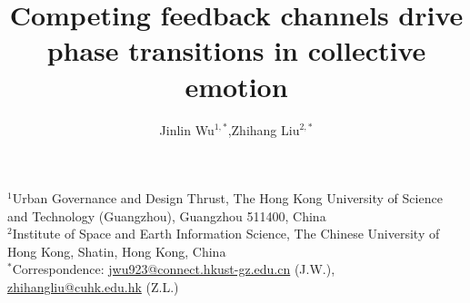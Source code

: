 \documentclass[12pt]{article}
\begin{document}
\doublespacing
\linenumbers

\title{\Large\textbf{Competing feedback channels drive phase transitions in collective emotion}}

\author{
  Jinlin Wu$^{1,*}$,\quad Zhihang Liu$^{2,*}$
}

\date{}
\maketitle

\begin{singlespace}
\noindent
{\small
$^{1}$Urban Governance and Design Thrust, The Hong Kong University of Science and Technology (Guangzhou), Guangzhou 511400, China\\[2pt]
$^{2}$Institute of Space and Earth Information Science, The Chinese University of Hong Kong, Shatin, Hong Kong, China\\[6pt]
$^{*}$Correspondence:\;
\href{mailto:jwu923@connect.hkust-gz.edu.cn}{jwu923@connect.hkust-gz.edu.cn} (J.W.),\;
\href{mailto:zhihangliu@cuhk.edu.hk}{zhihangliu@cuhk.edu.hk} (Z.L.)
}
\end{singlespace}

\vspace{1em}
\end{document}
